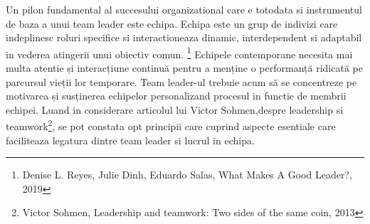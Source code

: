 \documentclass[a4paper, 12pt]{article}
\begin{document}
	\quad\space Un pilon fundamental al succesului organizational care e totodata si instrumentul de baza a unui team leader este echipa. Echipa este un grup de indivizi care indeplinesc roluri specifice si interactioneaza dinamic, interdependent si adaptabil in vederea atingerii unui obiectiv comun. \footnote{Denise L. Reyes, Julie Dinh, Eduardo Salas, What Makes A Good Leader?, 2019} Echipele contemporane necesita mai multa atentie și interacțiune continuă pentru a menține o performanță ridicată pe parcursul vieții lor temporare. Team leader-ul  trebuie acum să se concentreze pe motivarea și susținerea echipelor personalizand procesul in functie de membrii echipei. Luand in considerare articolul lui Victor Sohmen,despre leadership si teamwork\footnote{ Victor Sohmen, Leadership and teamwork: Two sides of the same coin, 2013}, se pot constata opt principii care cuprind aspecte esentiale care faciliteaza legatura dintre team leader si lucrul in echipa.
\end{document}
